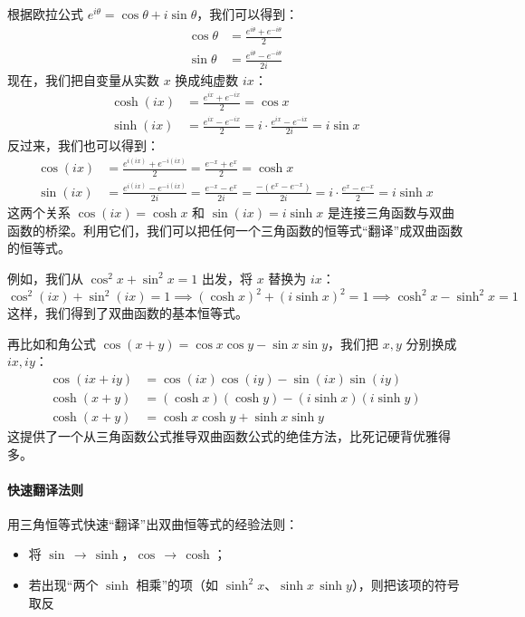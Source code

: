 \documentclass[lang=cn,newtx,10pt,scheme=chinese]{elegantbook}
\begin{document}
\begin{example}
  根据欧拉公式 $e^{i\theta} = \cos\theta + i\sin\theta$，我们可以得到：
  \begin{align}
    \cos\theta &= \frac{e^{i\theta} + e^{-i\theta}}{2} \\
    \sin\theta &= \frac{e^{i\theta} - e^{-i\theta}}{2i}
  \end{align}
  现在，我们把自变量从实数 $x$ 换成纯虚数 $ix$：
  \begin{align}
    \cosh(ix) &= \frac{e^{ix} + e^{-ix}}{2} = \cos x \\
    \sinh(ix) &= \frac{e^{ix} - e^{-ix}}{2} = i \cdot \frac{e^{ix} - e^{-ix}}{2i} = i\sin x
  \end{align}
  反过来，我们也可以得到：
  \begin{align}
    \cos(ix) &= \frac{e^{i(ix)} + e^{-i(ix)}}{2} = \frac{e^{-x} + e^{x}}{2} = \cosh x \\
    \sin(ix) &= \frac{e^{i(ix)} - e^{-i(ix)}}{2i} = \frac{e^{-x} - e^{x}}{2i} = \frac{-(e^x - e^{-x})}{2i} = i \cdot \frac{e^x - e^{-x}}{2} = i\sinh x
  \end{align}
  这两个关系 $\cos(ix) = \cosh x$ 和 $\sin(ix) = i\sinh x$ 是连接三角函数与双曲函数的桥梁。利用它们，我们可以把任何一个三角函数的恒等式“翻译”成双曲函数的恒等式。
  
  例如，我们从 $\cos^2 x + \sin^2 x = 1$ 出发，将 $x$ 替换为 $ix$：
  \begin{equation}
    \cos^2(ix) + \sin^2(ix) = 1 \implies (\cosh x)^2 + (i\sinh x)^2 = 1 \implies \cosh^2 x - \sinh^2 x = 1
  \end{equation}
  这样，我们得到了双曲函数的基本恒等式。
  
  再比如和角公式 $\cos(x+y) = \cos x \cos y - \sin x \sin y$，我们把 $x, y$ 分别换成 $ix, iy$：
  \begin{align*}
    \cos(ix+iy) &= \cos(ix)\cos(iy) - \sin(ix)\sin(iy) \\
    \cosh(x+y) &= (\cosh x)(\cosh y) - (i\sinh x)(i\sinh y) \\
    \cosh(x+y) &= \cosh x \cosh y + \sinh x \sinh y
  \end{align*}
  这提供了一个从三角函数公式推导双曲函数公式的绝佳方法，比死记硬背优雅得多。
  
  \paragraph{快速翻译法则}
  用三角恒等式快速“翻译”出双曲恒等式的经验法则：
  \begin{itemize}
    \item 将 $\sin\,\to\,\sinh$，$\cos\,\to\,\cosh$；
    \item 若出现“两个 $\sinh$ 相乘”的项（如 $\sinh^2x$、$\sinh x\,\sinh y$），则把该项的符号取反
    

\end{itemize}
\end{example}
\end{document}
